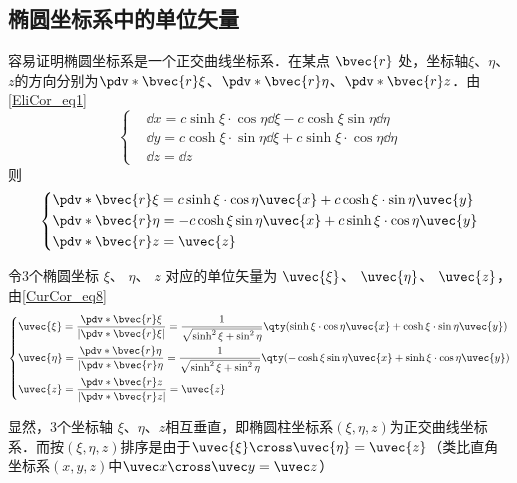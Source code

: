 \subsection{椭圆坐标系中的单位矢量}
容易证明椭圆坐标系是一个正交曲线坐标系．在某点 $\bvec{r}$ 处，坐标轴$\xi$、$\eta$、$z$的方向分别为$\pdv*{\bvec{r}}{\xi}$、$\pdv*{\bvec{r}}{\eta}$、$\pdv*{\bvec{r}}{z}$．由\autoref{EliCor_eq1} 
\begin{equation}\label{EliCor_eq2}
\left\{
    \begin{aligned}
    &\dd x=c\sinh\xi\cdot\cos\eta\dd\xi-c\cosh\xi\sin\eta\dd\eta\\
    &\dd y=c\cosh\xi\cdot\sin\eta\dd\xi+c\sinh\xi\cdot\cos\eta\dd\eta\\
    &\dd z=\dd z
    \end{aligned}\right.
\end{equation}
则
\begin{equation}
\left\{
    \begin{aligned}
&\pdv*{\bvec{r}}{\xi}=c\sinh\xi\cdot\cos\eta\uvec{x}+c\cosh\xi\cdot\sin\eta\uvec{y}\\
&\pdv*{\bvec{r}}{\eta}=-c\cosh\xi\sin\eta\uvec{x}+c\sinh\xi\cdot\cos\eta\uvec{y}\\
&\pdv*{\bvec{r}}{z}=\uvec{z}
    \end{aligned}\right.
\end{equation}

令3个椭圆坐标 $\xi$、 $\eta$、 $z$ 对应的单位矢量为 $\uvec{\xi}$、 $\uvec{\eta}$、 $\uvec{z}$，由\autoref{CurCor_eq8}~
\begin{equation}
\left\{
    \begin{aligned}
    &\uvec{\xi}=\frac{\pdv*{\bvec{r}}{\xi}}{|\pdv*{\bvec{r}}{\xi}|}=\frac{1}{\sqrt{\sinh^2\xi+\sin^2\eta}}\qty(\sinh\xi\cdot\cos\eta\uvec{x}+\cosh\xi\cdot\sin\eta\uvec{y})\\
    &\uvec{\eta }=\frac{\pdv*{\bvec{r}}{\eta}}{|\pdv*{\bvec{r}}{\eta}}=\frac{1}{\sqrt{\sinh^2\xi+\sin^2\eta}}\qty(-\cosh\xi\sin\eta\uvec{x}+\sinh\xi\cdot\cos\eta\uvec{y})\\
    &\uvec{z}=\frac{\pdv*{\bvec{r}}{z}}{|\pdv*{\bvec{r}}{z}|}=\uvec{z}
    \end{aligned}\right.
\end{equation}

显然，3个坐标轴 $\xi$、$\eta$、$z$相互垂直，即椭圆柱坐标系$(\xi,\eta,z)$为正交曲线坐标系．而按$(\xi,\eta,z)$排序是由于$\uvec{\xi}\cross\uvec{\eta}=\uvec{z}$（类比直角坐标系$(x,y,z)$中$\uvec x\cross\uvec y=\uvec z$）


